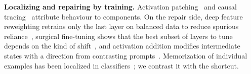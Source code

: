 \textbf{Localizing and repairing by training.} Activation patching~\cite{vig2020causal,heimersheim2024patching} and
causal tracing~\cite{meng2022locating} attribute behaviour to components. On the repair side, deep feature reweighting
retrains only the last layer on balanced data to reduce spurious reliance~\cite{kirichenko2023lastlayer}, surgical
fine-tuning shows that the best subset of layers to tune depends on the kind of shift~\cite{lee2023surgical}, and
activation addition modifies intermediate states with a direction from contrasting prompts~\cite{turner2023steering}.
Memorization of individual examples has been localized in classifiers~\cite{dankers2024memorisation}; we contrast it with
the shortcut.
